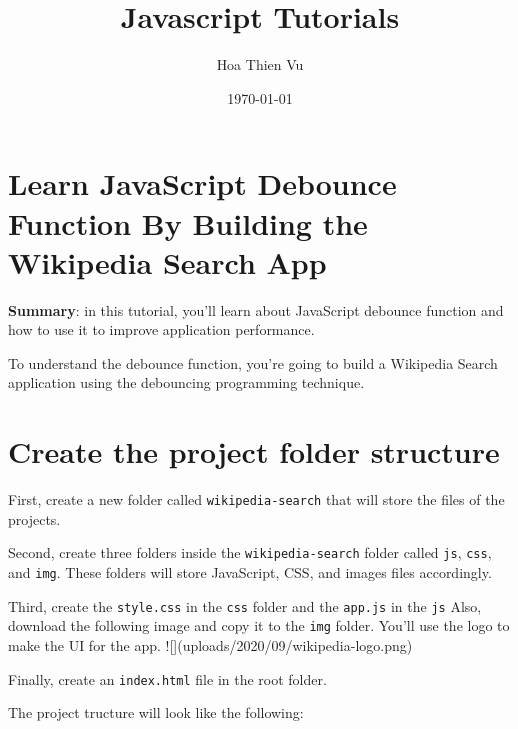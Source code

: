 \documentclass[11pt]{article}
\title{\textbf{Javascript Tutorials}}
\author{Hoa Thien Vu}
\date{\today}
\newenvironment{shadedquotation}
{\begin{shaded*}
\quoting[leftmargin=0pt, vskip=0pt]
}
 {\endquoting
 \end{shaded*}
}
\begin{document}
\maketitle
\newpage
\tableofcontents
\cleardoublepage
\newpage
\noindent
{}
\section*{\huge Learn JavaScript Debounce Function By Building the Wikipedia Search App}

\begin{shadedquotation}
\textbf{Summary}: in this tutorial, you'll learn about JavaScript debounce 
function and how to use it to improve application performance.
\end{shadedquotation}

\noindent
To understand the debounce function, you're going to build a Wikipedia
Search application using the debouncing programming technique.

\section*{Create the project folder structure}

First, create a new folder called \verb|wikipedia-search| that will store
the files of the projects.
\newline

\noindent
Second, create three folders inside the \verb|wikipedia-search| folder called
\verb|js|, \verb|css|, and \verb|img|. These folders will store JavaScript, CSS, and
images files accordingly.
\newline

\noindent
Third, create the \verb|style.css| in the \verb|css| folder and the \verb|app.js| in
the \verb|js| Also, download the following image and copy it to the \verb|img|
folder. You'll use the logo to make the UI for the app.
![](uploads/2020/09/wikipedia-logo.png)

\noindent
Finally, create an \verb|index.html| file in the root folder.
\newline

\noindent
The project tructure will look like the following:
\end{document}
